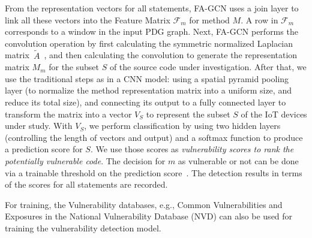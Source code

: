 From the representation vectors for all statements, FA-GCN uses a join
layer to link all these vectors into the Feature Matrix
$\mathcal{F}_{m}$ for method $M$. A row in $\mathcal{F}_m$ corresponds
to a window in the input PDG graph.  Next, FA-GCN performs the
convolution operation by first calculating the symmetric normalized
Laplacian matrix~$\tilde{A}$~\cite{GCN16}, and then calculating the
convolution to generate the representation matrix $M_{m}$ for the
subset $S$ of the source code under investigation. After that, we use
the traditional steps as in a CNN model: using a spatial pyramid
pooling layer (to normalize the method representation matrix into a
uniform size, and reduce its total size), and connecting its output to
a fully connected layer to transform the matrix into a vector $V_S$ to
represent the subset $S$ of the IoT devices under study. With $V_S$,
we perform classification by using two hidden layers (controlling the
length of vectors and output) and a softmax function to produce a
prediction score for $S$. We use those scores as {\em vulnerability
  scores to rank the potentially vulnerable code}. The decision for
$m$ as vulnerable or not can be done via a trainable threshold on the
prediction score~\cite{li2018vuldeepecker,li2019improving}. The
detection results in terms of the scores for all statements are
recorded.


For training, the Vulnerability databases, e.g., Common
Vulnerabilities and Exposures in the National Vulnerability Database
(NVD) can also be used for training the vulnerability detection model.


